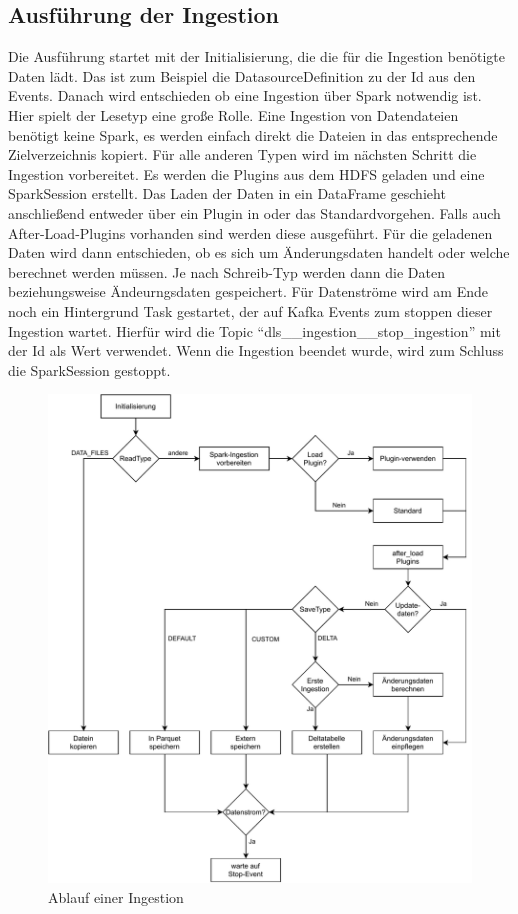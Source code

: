 \subsection{Ausführung der Ingestion}
\label{sec:ingestion-run}
Die Ausführung startet mit der Initialisierung, die die für die Ingestion benötigte Daten lädt.
Das ist zum Beispiel die DatasourceDefinition zu der Id aus den Events.
Danach wird entschieden ob eine Ingestion über Spark notwendig ist.
Hier spielt der Lesetyp eine große Rolle.
Eine Ingestion von Datendateien benötigt keine Spark, es werden einfach direkt die Dateien in das entsprechende Zielverzeichnis kopiert.
Für alle anderen Typen wird im nächsten Schritt die Ingestion vorbereitet.
Es werden die Plugins aus dem HDFS geladen und eine SparkSession erstellt.
Das Laden der Daten in ein DataFrame geschieht anschließend entweder über ein Plugin in oder das Standardvorgehen.
Falls auch After-Load-Plugins vorhanden sind werden diese ausgeführt.
Für die geladenen Daten wird dann entschieden, ob es sich um Änderungsdaten handelt oder welche berechnet werden müssen.
Je nach Schreib-Typ werden dann die Daten beziehungsweise Ändeurngsdaten gespeichert.
Für Datenströme wird am Ende noch ein Hintergrund Task gestartet, der auf Kafka Events zum stoppen dieser Ingestion wartet.
Hierfür wird die Topic "`dls\_\_ingestion\_\_stop\_ingestion"' mit der Id als Wert verwendet.
Wenn die Ingestion beendet wurde, wird zum Schluss die SparkSession gestoppt.

\begin{figure}
    \centering
    \includegraphics[width=\textwidth]{Grafiken/Umsetzung-Ingestion-Ablauf.pdf}
    \caption{Ablauf einer Ingestion}
    \label{fig:umsetz-ingestion-ablauf}
\end{figure}